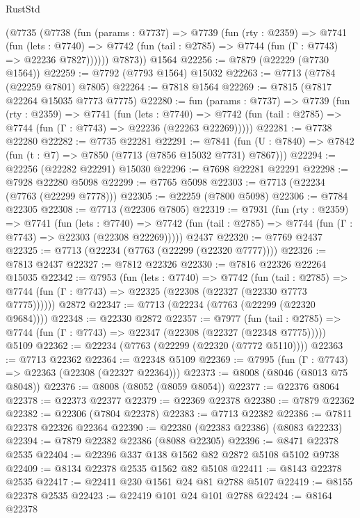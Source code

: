 \begin{lexlean}{RustStd}
\begin{coremodule}
      (@7735
        (@7738
          (fun (params : @7737) =>
          @7739
            (fun (rty : @2359) =>
            @7741
              (fun (lets : @7740) =>
              @7742 (fun (tail : @2785) => @7744 (fun (Γ : @7743) => @22236 @7827))))))
        @7873))
    @1564
@22256 := @7879 (@22229 (@7730 @1564))
@22259 := @7792 (@7793 @1564) @15032
@22263 := @7713 (@7784 (@22259 @7801) @7805)
@22264 := @7818 @1564
@22269 := @7815 (@7817 @22264 @15035 @7773 @7775)
@22280 := fun (params : @7737) =>
  @7739
    (fun (rty : @2359) =>
    @7741
      (fun (lets : @7740) =>
      @7742 (fun (tail : @2785) => @7744 (fun (Γ : @7743) => @22236 (@22263 @22269)))))
@22281 := @7738 @22280
@22282 := @7735 @22281
@22291 := @7841
    (fun (U : @7840) => @7842 (fun (t : @7) => @7850 (@7713 (@7856 @15032 @7731) @7867)))
@22294 := @22256 (@22282 @22291) @15030
@22296 := @7698 @22281 @22291
@22298 := @7928 @22280 @5098
@22299 := @7765 @5098
@22303 := @7713 (@22234 (@7763 (@22299 @7778)))
@22305 := @22259 (@7800 @5098)
@22306 := @7784 @22305
@22308 := @7713 (@22306 @7805)
@22319 := @7931
    (fun (rty : @2359) =>
    @7741
      (fun (lets : @7740) =>
      @7742 (fun (tail : @2785) => @7744 (fun (Γ : @7743) => @22303 (@22308 @22269)))))
    @2437
@22320 := @7769 @2437
@22325 := @7713 (@22234 (@7763 (@22299 (@22320 @7777))))
@22326 := @7813 @2437
@22327 := @7812 @22326
@22330 := @7816 @22326 @22264 @15035
@22342 := @7953
    (fun (lets : @7740) =>
    @7742
      (fun (tail : @2785) =>
      @7744 (fun (Γ : @7743) => @22325 (@22308 (@22327 (@22330 @7773 @7775))))))
    @2872
@22347 := @7713 (@22234 (@7763 (@22299 (@22320 @9684))))
@22348 := @22330 @2872
@22357 := @7977
    (fun (tail : @2785) => @7744 (fun (Γ : @7743) => @22347 (@22308 (@22327 (@22348 @7775)))))
    @5109
@22362 := @22234 (@7763 (@22299 (@22320 (@7772 @5110))))
@22363 := @7713 @22362
@22364 := @22348 @5109
@22369 := @7995 (fun (Γ : @7743) => @22363 (@22308 (@22327 @22364)))
@22373 := @8008 (@8046 (@8013 @75 @8048))
@22376 := @8008 (@8052 (@8059 @8054))
@22377 := @22376 @8064
@22378 := @22373 @22377
@22379 := @22369 @22378
@22380 := @7879 @22362
@22382 := @22306 (@7804 @22378)
@22383 := @7713 @22382
@22386 := @7811 @22378 @22326 @22364
@22390 := @22380 (@22383 @22386) (@8083 @22233)
@22394 := @7879 @22382 @22386 (@8088 @22305)
@22396 := @8471 @22378 @2535
@22404 := @22396 @337 @138 @1562 @82 @2872 @5108 @5102 @9738
@22409 := @8134 @22378 @2535 @1562 @82 @5108
@22411 := @8143 @22378 @2535
@22417 := @22411 @230 @1561 @24 @81 @2788 @5107
@22419 := @8155 @22378 @2535
@22423 := @22419 @101 @24 @101 @2788
@22424 := @8164 @22378

\end{coremodule}
\end{lexlean}
